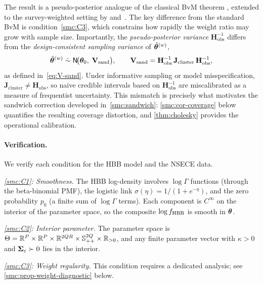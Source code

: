 The result is a pseudo-posterior analogue of the classical BvM theorem
\citep{KleijnVanDerVaart2012}, extended to the survey-weighted setting by
\citet{SavitskyToth2016} and~\citet{WilliamsSavitsky2021}.  The key
difference from the standard BvM is condition~\ref{smc:C3}, which
constrains how rapidly the weight ratio may grow with sample size.
Importantly, the \emph{pseudo-posterior variance}
$\mathbf{H}_{\mathrm{obs}}^{-1}$ differs from the
\emph{design-consistent sampling variance} of $\hat{\boldsymbol{\theta}}^{(w)}$,
\[
  \hat{\boldsymbol{\theta}}^{(w)}
  \;\dot{\sim}\;
  \textsf{N}\!\bigl(\boldsymbol{\theta}_0,\;
  \mathbf{V}_{\mathrm{sand}}\bigr),
  \qquad
  \mathbf{V}_{\mathrm{sand}}
  = \mathbf{H}_{\mathrm{obs}}^{-1}\,
    \mathbf{J}_{\mathrm{cluster}}\,
    \mathbf{H}_{\mathrm{obs}}^{-1},
\]
as defined in~\eqref{eq:V-sand}. Under informative sampling or model
misspecification,
$\mathbf{J}_{\mathrm{cluster}} \neq \mathbf{H}_{\mathrm{obs}}$,
so naive credible intervals based on $\mathbf{H}_{\mathrm{obs}}^{-1}$
are miscalibrated as a measure of frequentist uncertainty.  This
mismatch is precisely what motivates the sandwich correction developed
in~\cref{smc:sandwich}: \cref{smc:cor-coverage} below quantifies
the resulting coverage distortion, and
\cref{thm:cholesky} provides the operational calibration.


\paragraph{Verification.}
We verify each condition for the HBB model and the NSECE data.

\medskip\noindent\textit{\ref{smc:C1}: Smoothness.}\enspace
The HBB log-density involves $\log\Gamma$ functions (through the
beta-binomial PMF), the logistic link
$\sigma(\eta) = 1/(1+e^{-\eta})$, and the zero probability $p_0$
(a finite sum of $\log\Gamma$ terms).  Each component is $C^{\infty}$
on the interior of the parameter space, so the composite
$\log f_{\operatorname{HBB}}$ is smooth in $\boldsymbol{\theta}$.  \checkmark

\medskip\noindent\textit{\ref{smc:C2}: Interior parameter.}\enspace
The parameter space is
$\Theta = \mathbb{R}^P \times \mathbb{R}^P \times \mathbb{R}^{2QR} \times
\mathbb{S}_{++}^{2Q} \times \mathbb{R}_{>0}$,
and any finite parameter vector with $\kappa > 0$ and
$\boldsymbol{\Sigma}_\varepsilon \succ 0$ lies in the interior.  \checkmark

\medskip\noindent\textit{\ref{smc:C3}: Weight regularity.}\enspace
This condition requires a dedicated analysis; see
\cref{smc:prop-weight-diagnostic} below.

